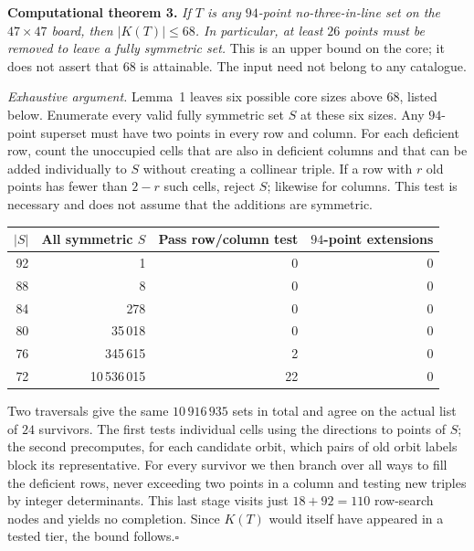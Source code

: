 \documentclass[11pt]{article}
\begin{document}
\textbf{Computational theorem 3.} \emph{If $T$ is any $94$-point no-three-in-line set on the $47\times47$ board, then $|K(T)|\le68$. In particular, at least $26$ points must be removed to leave a fully symmetric set.} This is an upper bound on the core; it does not assert that $68$ is attainable. The input need not belong to any catalogue.

\emph{Exhaustive argument.} Lemma~1 leaves six possible core sizes above $68$, listed below. Enumerate every valid fully symmetric set $S$ at these six sizes. Any $94$-point superset must have two points in every row and column. For each deficient row, count the unoccupied cells that are also in deficient columns and that can be added individually to $S$ without creating a collinear triple. If a row with $r$ old points has fewer than $2-r$ such cells, reject $S$; likewise for columns. This test is necessary and does not assume that the additions are symmetric.

\begin{center}
\begin{tabular}{r r r r}
\toprule
$|S|$ & All symmetric $S$ & Pass row/column test & $94$-point extensions\\
\midrule
92 & 1 & 0 & 0\\
88 & 8 & 0 & 0\\
84 & 278 & 0 & 0\\
80 & 35\,018 & 0 & 0\\
76 & 345\,615 & 2 & 0\\
72 & 10\,536\,015 & 22 & 0\\
\bottomrule
\end{tabular}
\end{center}

Two traversals give the same $10\,916\,935$ sets in total and agree on the actual list of $24$ survivors. The first tests individual cells using the directions to points of $S$; the second precomputes, for each candidate orbit, which pairs of old orbit labels block its representative. For every survivor we then branch over all ways to fill the deficient rows, never exceeding two points in a column and testing new triples by integer determinants. This last stage visits just $18+92=110$ row-search nodes and yields no completion. Since $K(T)$ would itself have appeared in a tested tier, the bound follows.\hfill$\square$
\end{document}
